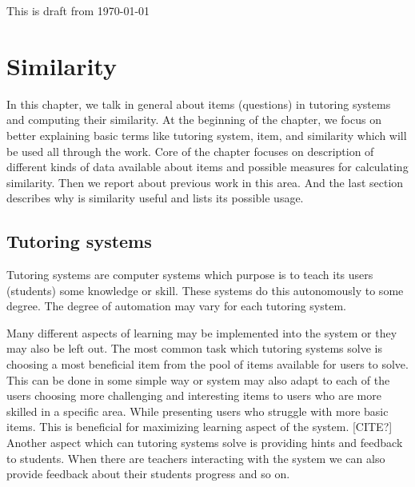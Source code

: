 \documentclass[
  digital, %
  table,   %
  nolof,     %
  nolot,     %
  nocover,
  color
]{fithesis3}
\begin{document}
This is draft from \today %

\chapter{Similarity}



In this chapter, we talk in general about items (questions) in tutoring systems and computing their similarity. At the beginning of the chapter, we focus on better explaining basic terms like tutoring system, item, and similarity which will be used all through the work. Core of the chapter focuses on description of different kinds of data available about items and possible measures for calculating similarity. Then we report about previous work in this area. And the last section describes why is similarity useful and lists its possible usage.


\section{Tutoring systems}\label{tutoring-systems}

Tutoring systems are computer systems which purpose is to teach its users (students) some knowledge or skill. These systems do this autonomously to some degree. The degree of automation may vary for each tutoring system.


Many different aspects of learning may be implemented into the system or they may also be left out. The most common task which tutoring systems solve is choosing a most beneficial item from the pool of items available for users to solve. This can be done in some simple way or system may also adapt to each of the users choosing more challenging and interesting items to users who are more skilled in a specific area. While presenting users who struggle with more basic items. This is beneficial for maximizing learning aspect of the system. [CITE?] Another aspect which can tutoring systems solve is providing hints and feedback to students. When there are teachers interacting with the system we can also provide feedback about their students progress and so on.

\end{document}
